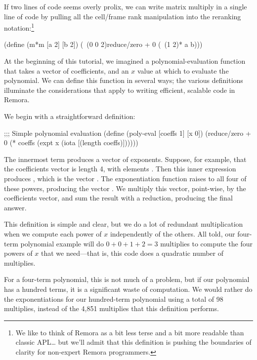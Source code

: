 If two lines of code seems overly prolix,
we can write matrix multiply in a single line of code
by pulling all the cell/frame rank manipulation into the
reranking notation:\footnote{
  We like to think of Remora as a bit less terse
  and a bit more readable than classic APL\ldots
  but we'll admit that this definition is pushing
  the boundaries of clarity for non-expert Remora
  programmers.}
\begin{code}
    (define (m*m [a 2] [b 2])
      (~(0 0 2)reduce/zero + 0 (~(1 2)* a b)))\end{code}

At the beginning of this tutorial, we imagined a polynomial-evaluation
function that takes a vector of coefficients,
and an $x$ value at which to evaluate the polynomial.
We can define this function in several ways;
the various definitions illuminate the considerations that apply to
writing efficient, scalable code in Remora.

We begin with a straightforward definition:
\begin{code}
;;; Simple polynomial evaluation
(define (poly-eval [coeffs 1] [x 0])
  (reduce/zero + 0
               (* coeffs
                  (expt x (iota [(length coeffs)])))))\end{code}
The innermost  term produces a vector
of exponents.
Suppose, for example, that the coefficients vector is length 4,
with elements \ex{[$c_0$ $c_1$ $c_2$ $c_3$]}.
Then this inner expression produces ,
which is the vector \ex{[0 1 2 3]}.
The exponentiation function  raises 
to all four of these powers,
producing the vector \ex{[$x^0$ $x^1$ $x^2$ $x^3$]}.
We multiply this vector, point-wise, by the coefficients vector,
and sum the result with a reduction, producing the final answer.

This definition is simple and clear, 
but we do a lot of redundant multiplication when we compute each
power of $x$ independently of the others.
All told, our four-term polynomial example will do $0 + 0 + 1 + 2 = 3$
multiplies to compute the four powers of $x$ that we need---that is,
this code does a quadratic number of multiplies.

For a four-term polynomial, this is not much of a problem,
but if our polynomial has a hundred terms, 
it is a significant waste of computation.
We would rather do the exponentiations for our hundred-term polynomial
using a total of 98 multiplies,
instead of the 4,851 multiplies that this definition performs.

